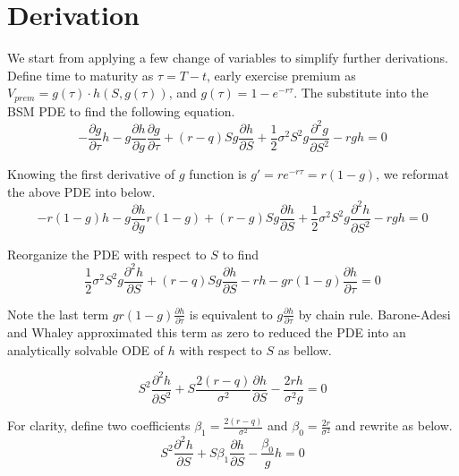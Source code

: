 \documentclass{article}
\begin{document}
\section{Derivation}

We start from applying a few change of variables to simplify further derivations.
Define time to maturity as $ \tau = T - t$, early exercise premium as $ V_{prem} = g\left(\tau\right) \cdot h\left(S, g\left(\tau\right)\right) $, and $ g\left(\tau\right) = 1 - e^{-r \tau} $.
The substitute into the BSM PDE to find the following equation.
\begin{equation}
    -\frac{\partial g}{\partial \tau} h - g \frac{\partial h}{\partial g} \frac{\partial g}{\partial \tau} + (r - q) S g \frac{\partial h}{\partial S} + \frac{1}{2} \sigma^2 S^2 g \frac{\partial^2 g}{\partial S^2} - r g h = 0
\end{equation}

Knowing the first derivative of $ g $ function is $ g' = r e^{-r \tau} = r \left(1 - g\right) $, we reformat the above PDE into below.
\begin{equation}
    -r \left(1 - g\right) h - g \frac{\partial h}{\partial g} r \left(1 - g\right) + (r - g) S g \frac{\partial h}{\partial S} + \frac{1}{2} \sigma^2 S^2 g \frac{\partial^2 h}{\partial S^2} - r g h = 0
\end{equation}

Reorganize the PDE with respect to $ S $ to find
\begin{equation}
    \frac{1}{2} \sigma^2 S^2 g \frac{\partial^2 h}{\partial S} + \left(r - q\right) S g \frac{\partial h}{\partial S} - r h - g r \left(1 - g\right) \frac{\partial h}{\partial \tau} = 0
\end{equation}

Note the last term $ g r \left(1 - g\right) \frac{\partial h}{\partial \tau} $ is equivalent to $ g \frac{\partial h}{\partial \tau} $ by chain rule.
Barone-Adesi and Whaley \cite{Efficient Analytic Approximation of American Option Values} approximated this term as zero to reduced the PDE into an analytically solvable ODE of $ h $ with respect to $ S $ as bellow.

\begin{equation}
    S^2 \frac{\partial^2 h}{\partial S^2} + S \frac{2 \left(r - q\right)}{\sigma^2} \frac{\partial h}{\partial S} - \frac{2 r h}{\sigma^2 g} = 0
\end{equation}

For clarity, define two coefficients $ \beta_{1} = \frac{2 \left(r - q\right)}{\sigma^2} $ and $ \beta_{0} = \frac{2 r}{\sigma^2} $ and rewrite as below.
\begin{equation}
    S^2 \frac{\partial^2 h}{\partial S} + S \beta_{1} \frac{\partial h}{\partial S} - \frac{\beta_0}{g} h = 0
\end{equation}
\end{document}
